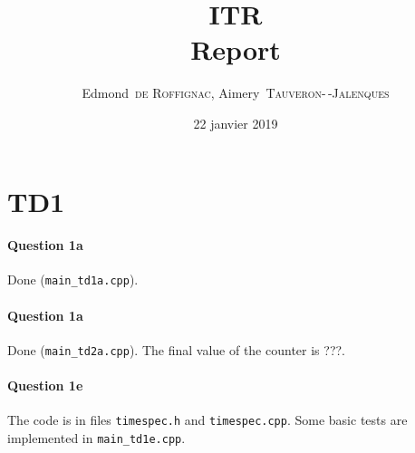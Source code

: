 \documentclass[a4paper,oneside,11pt]{article}
\title{ITR\\Report}
\author{Edmond~\textsc{de Roffignac}, Aimery~\textsc{Tauveron-\,-Jalenques}}
\date{22 janvier 2019}
\begin{document}
\maketitle

\section*{TD1}

\paragraph{Question 1a} Done (\texttt{main\_td1a.cpp}).

\paragraph{Question 1a} Done (\texttt{main\_td2a.cpp}). The final value of the counter is ???.

\paragraph{Question 1e} The code is in files \texttt{timespec.h} and \texttt{timespec.cpp}. Some basic tests are implemented in \texttt{main\_td1e.cpp}.
\end{document}
